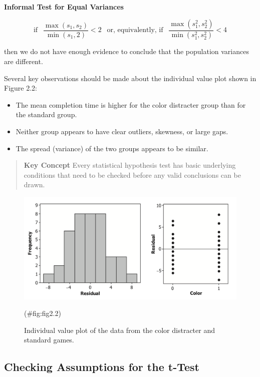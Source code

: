 \documentclass[
]{report}
\providecommand{\tightlist}{%
  \setlength{\itemsep}{0pt}\setlength{\parskip}{0pt}}
\begin{document}
\textbf{Informal Test for Equal Variances}

\[
\text{if }~~  \frac{\max(s_1, s_2)}{\min(s_1,2)} < 2 
~~ \text{ or, equivalently, if } 
~~ \frac{\max(s^2_1, s^2_2)}{\min(s^2_1,s^2_2)} < 4
\]

then we do not have enough evidence to conclude that the population variances are different.

Several key observations should be made about the individual value plot shown in Figure 2.2:

\begin{itemize}
\tightlist
\item
  The mean completion time is higher for the color distracter group than for the standard group.
\item
  Neither group appears to have clear outliers, skewness, or large gaps.
\item
  The spread (variance) of the two groups appears to be similar.
\end{itemize}

\begin{quote}
\textbf{Key Concept}
Every statistical hypothesis test has basic underlying conditions that need to be checked before any valid conclusions can be drawn.
\end{quote}

\begin{figure}

{\centering \includegraphics[width=1\linewidth]{docs/Fig2_2} 

}

\caption{Individual value plot of the data from the color distracter and standard games.}(\#fig:fig2.2)
\end{figure}

\subsection*{Checking Assumptions for the t-Test}\label{checking-assumptions-for-the-t-test}
\end{document}
